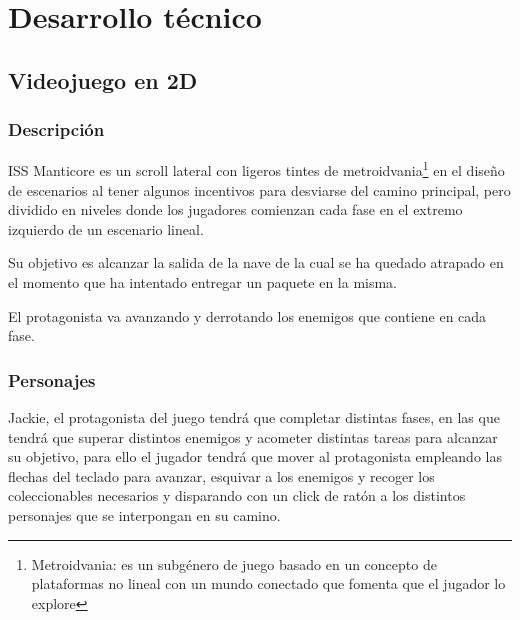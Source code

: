

\chapter{Desarrollo técnico}
\section{Videojuego en 2D}
\subsection{Descripción}ISS Manticore es un scroll lateral con ligeros tintes de metroidvania\footnote{Metroidvania: es un subgénero de juego basado en un concepto de plataformas no lineal con un mundo conectado que fomenta que el jugador lo explore} en el diseño de escenarios al tener algunos incentivos para desviarse del camino principal, pero dividido en niveles donde los jugadores comienzan cada fase en el extremo izquierdo de un escenario lineal.

Su objetivo es alcanzar la salida de la nave de la cual se ha quedado atrapado en el momento que ha intentado entregar un paquete en la misma.

El protagonista va avanzando y derrotando los enemigos que contiene en cada fase.
\subsection{Personajes}
Jackie, el protagonista del juego tendrá que completar distintas fases, en las que tendrá que superar distintos enemigos y acometer distintas tareas para alcanzar su objetivo, para ello el jugador tendrá que mover al protagonista empleando las flechas del teclado para avanzar, esquivar a los enemigos y recoger los coleccionables necesarios y disparando con un click de ratón a los distintos personajes que se interpongan en su camino.

